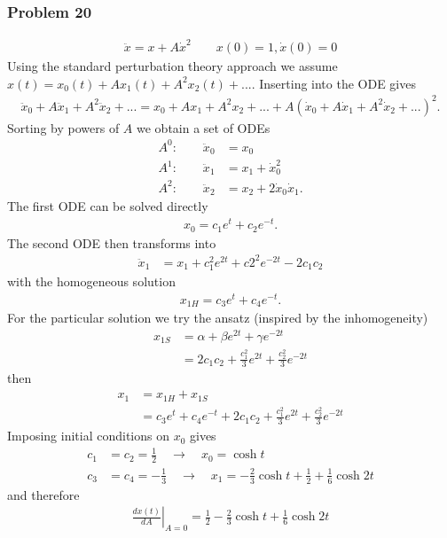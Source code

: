 \documentclass[10pt,a4paper]{article}
\theoremstyle{definition}
\begin{document}
\subsubsection{Problem 20}
\begin{align}
    \ddot{x}=x+A\dot{x}^2\quad\quad x(0)=1, \dot{x}(0)=0
\end{align}
Using the standard perturbation theory approach we assume $x(t)=x_0(t)+Ax_1(t)+A^2x_2(t)+...$. Inserting into the ODE gives 
\begin{align}
    \ddot{x}_0+A\ddot{x}_1+A^2\ddot{x}_2+...=x_0+Ax_1+A^2x_2+...+A\left(\dot{x}_0+A\dot{x}_1+A^2\dot{x}_2+...\right)^2.
\end{align}
Sorting by powers of $A$ we obtain a set of ODEs
\begin{align}
    A^0:\quad\quad\ddot{x}_0&=x_0\\
    A^1:\quad\quad\ddot{x}_1&=x_1+\dot{x}_0^2\\
    A^2:\quad\quad\ddot{x}_2&=x_2+2\dot{x}_0\dot{x}_1.
\end{align}
The first ODE can be solved directly
\begin{align}
    x_0=c_1e^t+c_2e^{-t}.
\end{align}
The second ODE then transforms into
\begin{align}
    \ddot{x}_1&=x_1+c_1^2e^{2t}+c2^2e^{-2t}-2c_1c_2
\end{align}
with the homogeneous solution
\begin{align}
    x_{1H}=c_3e^t+c_4e^{-t}.
\end{align}
For the particular solution we try the ansatz (inspired by the inhomogeneity) 
\begin{align}
    x_{1S}&=\alpha+\beta e^{2t}+\gamma e^{-2t}\\
    &=2c_1c_2+\frac{c_1^2}{3}e^{2t}+\frac{c_2^2}{3}e^{-2t}
\end{align}
then
\begin{align}
x_1&=x_{1H}+x_{1S}\\
&=c_3e^t+c_4e^{-t}+2c_1c_2+\frac{c_1^2}{3}e^{2t}+\frac{c_2^2}{3}e^{-2t}
\end{align}
Imposing initial conditions on $x_0$ gives
\begin{align}
    c_1&=c_2=\frac{1}{2}\quad\rightarrow\quad x_0=\cosh t\\
    c_3&=c_4=-\frac{1}{3}\quad\rightarrow\quad x_1=-\frac{2}{3}\cosh t+\frac{1}{2}+\frac{1}{6}\cosh 2t
\end{align}
and therefore
\begin{align}
    \left.\frac{dx(t)}{dA}\right|_{A=0}=\frac{1}{2}-\frac{2}{3}\cosh t+\frac{1}{6}\cosh 2t
\end{align}
\end{document}
